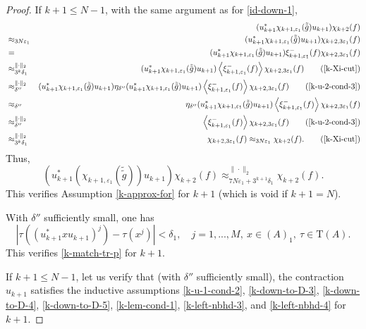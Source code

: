 \documentclass[12pt, oneside, psamsfonts]{amsart}
\theoremstyle{definition}
\theoremstyle{remark}
\numberwithin{equation}{section}
\newcommand{\norm}[1]{\| #1\|}
\newcommand{\abs}[1]{| #1 |}
\newcommand{\eps}{\varepsilon}
\newcommand{\tr}{\mathrm{T}}
\begin{document}
\begin{proof}
If $k+1 \leq N-1$, with the same argument as for \eqref{id-down-1}, 
\begin{eqnarray*}
 && (u_{k+1}^* \chi_{{k+1}, \eps_1}(\tilde{\tilde{g}}) u_{k+1})\chi_{k+2}(f) \\
 & \approx_{3N\eps_1} & (u_{k+1}^* \chi_{k+1, \eps_1}(\tilde{\tilde{g}}) u_{k+1})\chi_{k+2, 3\eps_1}(f) \\
 &=&  (u_{k+1}^* \chi_{k+1, \eps_1}(\tilde{\tilde{g}}) u_{k+1}) \xi_{k+1, \eps_1}^-(f)\chi_{k+2, 3\eps_1}(f) \\
 &\approx^{\norm{\cdot}_2}_{3^k\delta_1}&  (u_{k+1}^* \chi_{k+1, \eps_1}(\tilde{\tilde{g}}) u_{k+1}) \left< \xi_{k+1, \eps_1}^-(f) \right> \chi_{k+2, 3\eps_1}(f) \quad \quad (\eqref{k-Xi-cut}) \\
 & \approx_{\delta''}^{\norm{\cdot}_2} & (u_{k+1}^* \chi_{k+1, \eps_1}(\tilde{\tilde{g}}) u_{k+1}) \eta_{\delta''}(u_{k+1}^*\chi_{k+1, \eps_1}(\tilde{\tilde{g}})u_{k+1}) \left< \xi_{k+1, \eps_1}^-(f) \right> \chi_{k+2, 3\eps_1}(f) \quad \quad (\eqref{k-u-2-cond-3}) \\
& \approx_{\delta''} & \eta_{\delta''}(u_{k+1}^*\chi_{k+1, \eps_1}(\tilde{\tilde{g}})u_{k+1}) \left< \xi_{k+1, \eps_1}^-(f)\right> \chi_{k+2, 3\eps_1}(f)\\
 & \approx_{\delta''}^{\norm{\cdot}_2} &  \left<  \xi_{k+1, \eps_1}^-(f) \right> \chi_{k+2, 3\eps_1}(f) \quad \quad ( \eqref{k-u-2-cond-3}) \\
 & \approx^{\norm{\cdot}_2}_{3^k\delta_1} & \chi_{k+2, 3\eps_1}(f) \approx_{3N\eps_1} \chi_{k+2}(f).  \quad \quad (\eqref{k-Xi-cut})
 \end{eqnarray*}
Thus, 
\begin{equation*}%
 (u_{k+1}^*(\chi_{k+1, \eps_1}(\tilde{\tilde{g}}) )u_{k+1}) \chi_{k+2}(f) \approx_{7N\eps_1 + 3^{k+1}\delta_1}^{\norm{\cdot}_2} \chi_{k+2}(f).
\end{equation*}
This verifies Assumption \eqref{k-approx-for} for $k+1$ (which is void if $k+1 = N$).

With $\delta''$ sufficiently small, one has  
\begin{equation*}
\abs{\tau((u_{k+1}^* x u_{k+1})^j) - \tau(x^j)} < \delta_1,\quad j=1, ..., M,\  x\in (A)_1,\ \tau \in \tr(A). 
\end{equation*}
This verifies \eqref{k-match-tr-p} for $k+1$.

 
If $k+1 \leq N-1$, let us verify that (with $\delta''$ sufficiently small), the contraction $u_{k+1}$ satisfies the inductive assumptions \eqref{k-u-1-cond-2}, \eqref{k-down-to-D-3}, \eqref{k-down-to-D-4}, \eqref{k-down-to-D-5}, \eqref{k-lem-cond-1}, \eqref{k-left-nbhd-3}, and \eqref{k-left-nbhd-4} for $k+1$.
 

\end{proof}
\end{document}
